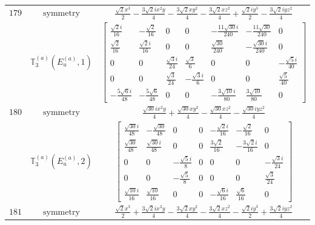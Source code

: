 \documentclass[fleqn,8pt,landscape]{jsarticle}
\begin{document}
\begin{longtable}{ccc}
$ 179 $ & $ \text{symmetry} $ & $ \frac{\sqrt{2} x^{3}}{2} - \frac{3 \sqrt{2} i x^{2} y}{4} - \frac{3 \sqrt{2} x y^{2}}{4} - \frac{3 \sqrt{2} x z^{2}}{4} + \frac{\sqrt{2} i y^{3}}{2} - \frac{3 \sqrt{2} i y z^{2}}{4} $ \\
$  $ & $ \mathbb{T}_{3}^{(a)}(E_{u}^{(a)},1) $ & $ \begin{bmatrix} \frac{\sqrt{2} i}{16} & - \frac{\sqrt{2}}{16} & 0 & 0 & - \frac{11 \sqrt{30} i}{240} & - \frac{11 \sqrt{30}}{240} & 0 \\ \frac{\sqrt{2}}{16} & \frac{\sqrt{2} i}{16} & 0 & 0 & \frac{\sqrt{30}}{240} & - \frac{\sqrt{30} i}{240} & 0 \\ 0 & 0 & \frac{\sqrt{3} i}{24} & \frac{\sqrt{3}}{6} & 0 & 0 & - \frac{\sqrt{5} i}{40} \\ 0 & 0 & \frac{\sqrt{3}}{24} & - \frac{\sqrt{3} i}{6} & 0 & 0 & \frac{\sqrt{5}}{40} \\ - \frac{5 \sqrt{6} i}{48} & - \frac{5 \sqrt{6}}{48} & 0 & 0 & - \frac{3 \sqrt{10} i}{80} & \frac{3 \sqrt{10}}{80} & 0 \end{bmatrix} $ \\ \hline
$ 180 $ & $ \text{symmetry} $ & $ \frac{\sqrt{30} i x^{2} y}{4} + \frac{\sqrt{30} x y^{2}}{4} - \frac{\sqrt{30} x z^{2}}{4} - \frac{\sqrt{30} i y z^{2}}{4} $ \\
$  $ & $ \mathbb{T}_{3}^{(a)}(E_{u}^{(a)},2) $ & $ \begin{bmatrix} \frac{\sqrt{30} i}{48} & - \frac{\sqrt{30}}{48} & 0 & 0 & - \frac{\sqrt{2} i}{16} & - \frac{\sqrt{2}}{16} & 0 \\ \frac{\sqrt{30}}{48} & \frac{\sqrt{30} i}{48} & 0 & 0 & \frac{3 \sqrt{2}}{16} & - \frac{3 \sqrt{2} i}{16} & 0 \\ 0 & 0 & - \frac{\sqrt{5} i}{8} & 0 & 0 & 0 & - \frac{\sqrt{3} i}{24} \\ 0 & 0 & - \frac{\sqrt{5}}{8} & 0 & 0 & 0 & \frac{\sqrt{3}}{24} \\ \frac{\sqrt{10} i}{16} & \frac{\sqrt{10}}{16} & 0 & 0 & - \frac{\sqrt{6} i}{16} & \frac{\sqrt{6}}{16} & 0 \end{bmatrix} $ \\ \hline
$ 181 $ & $ \text{symmetry} $ & $ \frac{\sqrt{2} x^{3}}{2} + \frac{3 \sqrt{2} i x^{2} y}{4} - \frac{3 \sqrt{2} x y^{2}}{4} - \frac{3 \sqrt{2} x z^{2}}{4} - \frac{\sqrt{2} i y^{3}}{2} + \frac{3 \sqrt{2} i y z^{2}}{4} $ \\

\end{longtable}
\end{document}
